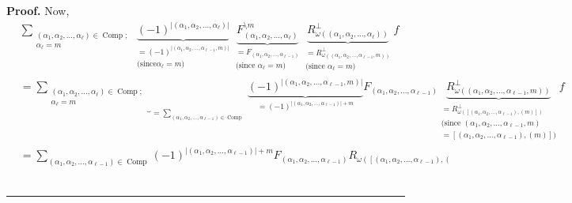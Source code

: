 \documentclass
[numbers=enddot,12pt,final,onecolumn,notitlepage,abstracton]{scrartcl}%
\theoremstyle{definition}
\newenvironment{proof}[1][Proof]{\noindent\textbf{#1.} }{\ \rule{0.5em}{0.5em}}
\newenvironment{verlong}{}{}
\let\sumnonlimits\sum
\renewcommand{\sum}{\sumnonlimits\limits}
\begin{document}
\begin{verlong}
\begin{proof}
Now,%
\begin{align}
&  \sum_{\substack{\left(  \alpha_{1},\alpha_{2},\ldots,\alpha_{\ell}\right)
\in\operatorname*{Comp};\\\alpha_{\ell}=m}}\underbrace{\left(  -1\right)
^{\left\vert \left(  \alpha_{1},\alpha_{2},\ldots,\alpha_{\ell}\right)
\right\vert }}_{\substack{=\left(  -1\right)  ^{\left\vert \left(  \alpha
_{1},\alpha_{2},\ldots,\alpha_{\ell-1},m\right)  \right\vert }\\\text{(since
}\alpha_{\ell}=m\text{)}}}\underbrace{F_{\left(  \alpha_{1},\alpha_{2}%
,\ldots,\alpha_{\ell}\right)  }^{\setminus m}}_{\substack{=F_{\left(
\alpha_{1},\alpha_{2},\ldots,\alpha_{\ell-1}\right)  }\\\text{(since }%
\alpha_{\ell}=m\text{)}}}\underbrace{R_{\omega\left(  \left(  \alpha
_{1},\alpha_{2},\ldots,\alpha_{\ell}\right)  \right)  }^{\perp}}%
_{\substack{=R_{\omega\left(  \left(  \alpha_{1},\alpha_{2},\ldots
,\alpha_{\ell-1},m\right)  \right)  }^{\perp}\\\text{(since }\alpha_{\ell
}=m\text{)}}}f\nonumber\\
&  =\underbrace{\sum_{\substack{\left(  \alpha_{1},\alpha_{2},\ldots
,\alpha_{\ell}\right)  \in\operatorname*{Comp};\\\alpha_{\ell}=m}}}%
_{=\sum_{\left(  \alpha_{1},\alpha_{2},\ldots,\alpha_{\ell-1}\right)
\in\operatorname*{Comp}}}\underbrace{\left(  -1\right)  ^{\left\vert \left(
\alpha_{1},\alpha_{2},\ldots,\alpha_{\ell-1},m\right)  \right\vert }%
}_{=\left(  -1\right)  ^{\left\vert \left(  \alpha_{1},\alpha_{2}%
,\ldots,\alpha_{\ell-1}\right)  \right\vert +m}}F_{\left(  \alpha_{1}%
,\alpha_{2},\ldots,\alpha_{\ell-1}\right)  }\underbrace{R_{\omega\left(
\left(  \alpha_{1},\alpha_{2},\ldots,\alpha_{\ell-1},m\right)  \right)
}^{\perp}}_{\substack{=R_{\omega\left(  \left[  \left(  \alpha_{1},\alpha
_{2},\ldots,\alpha_{\ell-1}\right)  ,\left(  m\right)  \right]  \right)
}^{\perp}\\\text{(since }\left(  \alpha_{1},\alpha_{2},\ldots,\alpha_{\ell
-1},m\right)  \\=\left[  \left(  \alpha_{1},\alpha_{2},\ldots,\alpha_{\ell
-1}\right)  ,\left(  m\right)  \right]  \text{)}}}f\nonumber\\
&  =\sum_{\left(  \alpha_{1},\alpha_{2},\ldots,\alpha_{\ell-1}\right)
\in\operatorname*{Comp}}\left(  -1\right)  ^{\left\vert \left(  \alpha
_{1},\alpha_{2},\ldots,\alpha_{\ell-1}\right)  \right\vert +m}F_{\left(
\alpha_{1},\alpha_{2},\ldots,\alpha_{\ell-1}\right)  }R_{\omega\left(  \left[
\left(  \alpha_{1},\alpha_{2},\ldots,\alpha_{\ell-1}\right)  ,\left(
}
\end{align}
\end{proof}
\end{verlong}
\end{document}
